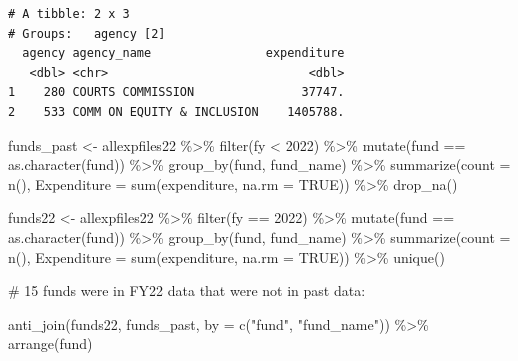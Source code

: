 \documentclass[
  letterpaper,
  DIV=11,
  numbers=noendperiod]{scrreport}
\newenvironment{Shaded}{\begin{snugshade}}{\end{snugshade}}
\newcommand{\AttributeTok}[1]{\textcolor[rgb]{0.40,0.45,0.13}{#1}}
\newcommand{\CommentTok}[1]{\textcolor[rgb]{0.37,0.37,0.37}{#1}}
\newcommand{\ConstantTok}[1]{\textcolor[rgb]{0.56,0.35,0.01}{#1}}
\newcommand{\DecValTok}[1]{\textcolor[rgb]{0.68,0.00,0.00}{#1}}
\newcommand{\FunctionTok}[1]{\textcolor[rgb]{0.28,0.35,0.67}{#1}}
\newcommand{\NormalTok}[1]{\textcolor[rgb]{0.00,0.23,0.31}{#1}}
\newcommand{\OtherTok}[1]{\textcolor[rgb]{0.00,0.23,0.31}{#1}}
\newcommand{\SpecialCharTok}[1]{\textcolor[rgb]{0.37,0.37,0.37}{#1}}
\newcommand{\StringTok}[1]{\textcolor[rgb]{0.13,0.47,0.30}{#1}}
\begin{document}
\begin{verbatim}
# A tibble: 2 x 3
# Groups:   agency [2]
  agency agency_name                expenditure
   <dbl> <chr>                            <dbl>
1    280 COURTS COMMISSION               37747.
2    533 COMM ON EQUITY & INCLUSION    1405788.
\end{verbatim}

\begin{Shaded}
\begin{Highlighting}[]
\NormalTok{funds\_past }\OtherTok{\textless{}{-}}\NormalTok{ allexpfiles22  }\SpecialCharTok{\%\textgreater{}\%} 
  \FunctionTok{filter}\NormalTok{(fy }\SpecialCharTok{\textless{}} \DecValTok{2022}\NormalTok{) }\SpecialCharTok{\%\textgreater{}\%} 
  \FunctionTok{mutate}\NormalTok{(fund }\SpecialCharTok{==} \FunctionTok{as.character}\NormalTok{(fund)) }\SpecialCharTok{\%\textgreater{}\%} 
  \FunctionTok{group\_by}\NormalTok{(fund, fund\_name) }\SpecialCharTok{\%\textgreater{}\%} 
  \FunctionTok{summarize}\NormalTok{(}\AttributeTok{count =} \FunctionTok{n}\NormalTok{(), }\AttributeTok{Expenditure =} \FunctionTok{sum}\NormalTok{(expenditure, }\AttributeTok{na.rm =} \ConstantTok{TRUE}\NormalTok{))  }\SpecialCharTok{\%\textgreater{}\%} 
  \FunctionTok{drop\_na}\NormalTok{()}

\NormalTok{funds22 }\OtherTok{\textless{}{-}}\NormalTok{ allexpfiles22  }\SpecialCharTok{\%\textgreater{}\%} 
  \FunctionTok{filter}\NormalTok{(fy }\SpecialCharTok{==} \DecValTok{2022}\NormalTok{) }\SpecialCharTok{\%\textgreater{}\%} 
  \FunctionTok{mutate}\NormalTok{(fund }\SpecialCharTok{==} \FunctionTok{as.character}\NormalTok{(fund)) }\SpecialCharTok{\%\textgreater{}\%} 
  \FunctionTok{group\_by}\NormalTok{(fund, fund\_name) }\SpecialCharTok{\%\textgreater{}\%}  
  \FunctionTok{summarize}\NormalTok{(}\AttributeTok{count =} \FunctionTok{n}\NormalTok{(), }\AttributeTok{Expenditure =} \FunctionTok{sum}\NormalTok{(expenditure, }\AttributeTok{na.rm =} \ConstantTok{TRUE}\NormalTok{)) }\SpecialCharTok{\%\textgreater{}\%} 
  \FunctionTok{unique}\NormalTok{()}

\CommentTok{\# 15 funds were in FY22 data that were not in past data:}

\FunctionTok{anti\_join}\NormalTok{(funds22, funds\_past, }\AttributeTok{by =} \FunctionTok{c}\NormalTok{(}\StringTok{"fund"}\NormalTok{, }\StringTok{"fund\_name"}\NormalTok{)) }\SpecialCharTok{\%\textgreater{}\%} \FunctionTok{arrange}\NormalTok{(fund)}
\end{Highlighting}
\end{Shaded}
\end{document}
